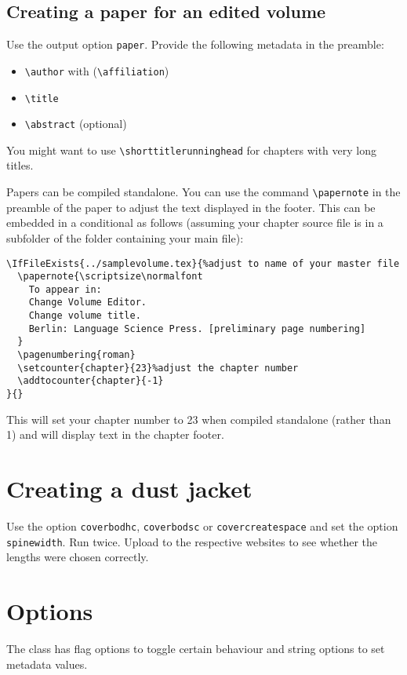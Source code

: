 \documentclass[%
output=guidelines,
guidelines]{langscibook}
\begin{document}
\section{Creating a paper for an edited volume}
Use the output option \texttt{paper}. Provide the following metadata in the preamble:
\begin{itemize}
 \item \verb+\author+ with (\verb+\affiliation+)
 \item \verb+\title+
 \item \verb+\abstract+ (optional) 
\end{itemize}

You might want to use \verb+\shorttitlerunninghead+ for chapters with very long titles. 

Papers can be compiled standalone. You can use the command \verb+\papernote+ in the preamble of the paper to adjust the text displayed in the footer.  This can be embedded in a conditional as follows (assuming your chapter source file is in a subfolder of the folder containing your main file): 
\begin{verbatim}
\IfFileExists{../samplevolume.tex}{%adjust to name of your master file
  \papernote{\scriptsize\normalfont 
    To appear in: 
    Change Volume Editor.  
    Change volume title.  
    Berlin: Language Science Press. [preliminary page numbering]
  }
  \pagenumbering{roman}
  \setcounter{chapter}{23}%adjust the chapter number
  \addtocounter{chapter}{-1}
}{}
\end{verbatim}

This will set your chapter number to 23 when compiled standalone (rather than 1) and will display text in the chapter footer.


 
\chapter{Creating a dust jacket}
Use the option \texttt{coverbodhc}, \texttt{coverbodsc} or \texttt{covercreatespace} and set the option \texttt{spinewidth}. Run {\XeLaTeX} twice. Upload to the respective websites to see whether the lengths were chosen correctly. 

\chapter{Options}
The class has flag options to toggle certain behaviour and string options to set metadata values.  
\end{document}
